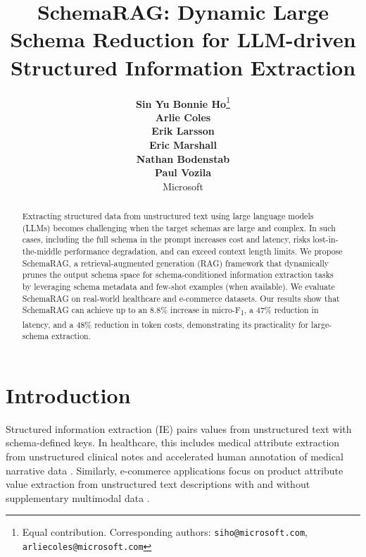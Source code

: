 \documentclass[11pt]{article}
\title{SchemaRAG: Dynamic Large Schema Reduction for LLM-driven Structured Information Extraction}
\author{
  \textbf{Sin Yu Bonnie Ho}\thanks{Equal contribution. Corresponding authors: \texttt{siho@microsoft.com}, \texttt{arliecoles@microsoft.com}} \\ \And
  \textbf{Arlie Coles}\footnotemark[1] \\ \And
  \textbf{Erik Larsson} \\ \AND
  \textbf{Eric Marshall} \\ \And
  \textbf{Nathan Bodenstab} \\ \And
  \textbf{Paul Vozila} \\ \AND
  \textnormal{Microsoft}
}
\begin{document}
\maketitle
\begin{abstract}
Extracting structured data from unstructured text using large language models (LLMs) becomes challenging when the target schemas are large and complex. 
In such cases, including the full schema in the prompt 
increases cost and latency, risks lost-in-the-middle performance degradation, and can exceed context length limits. 
We propose SchemaRAG, a retrieval-augmented generation (RAG) framework that dynamically prunes the output schema space for schema-conditioned information extraction tasks by leveraging schema metadata and few-shot examples (when available).
We evaluate SchemaRAG on real-world healthcare and e-commerce datasets. 
Our results show that SchemaRAG can achieve up to an 8.8\% increase in micro-F\textsubscript{1}, 
a 47\% reduction in latency, and a 48\% reduction in token costs,
demonstrating its practicality for large-schema extraction.
\end{abstract}



\section{Introduction}

Structured information extraction (IE) pairs values from unstructured text with schema-defined keys. In healthcare, 
this includes medical attribute extraction from unstructured clinical notes \cite{Jiang2011-qt, agrawal-etal-2022-large} and accelerated human annotation of medical narrative data \cite{pmlr-v225-goel23a}. 
Similarly, e-commerce applications focus on product attribute value extraction from unstructured text descriptions with and without supplementary multimodal data \cite{brinkmann2024,zhu-etal-2020-multimodal}.
\end{document}

